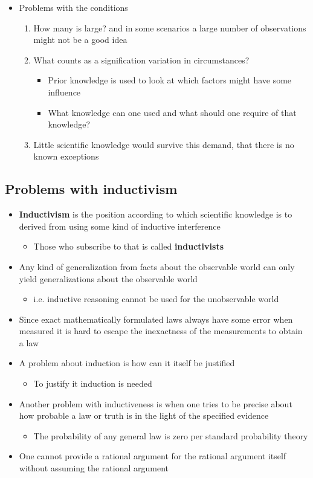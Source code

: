 \documentclass[11pt]{article}
\begin{document}
\begin{itemize}
\item Problems with the conditions
\begin{enumerate}
\item How many is large? and in some scenarios a large number of observations might not be a good idea
\item What counts as a signification variation in circumstances?
\begin{itemize}
\item Prior knowledge is used to look at which factors might have some influence
\item What knowledge can one used and what should one require of that knowledge?
\end{itemize}
\item Little scientific knowledge would survive this demand, that there is no known exceptions
\end{enumerate}
\end{itemize}

\subsection{Problems with inductivism}
\label{sec:org6b7e734}
\begin{itemize}
\item \textbf{Inductivism} is the position according to which scientific knowledge is to derived from using some kind of inductive interference
\begin{itemize}
\item Those who subscribe to that is called \textbf{inductivists}
\end{itemize}
\item Any kind of generalization from facts about the observable world can only yield generalizations about the observable world
\begin{itemize}
\item i.e. inductive reasoning cannot be used for the unobservable world
\end{itemize}
\item Since exact mathematically formulated laws always have some error when measured it is hard to escape the inexactness of the measurements to obtain a law
\item A problem about induction is how can it itself be justified
\begin{itemize}
\item To justify it induction is needed
\end{itemize}
\item Another problem with inductiveness is when one tries to be precise about how probable a law or truth is in the light of the specified evidence 
\begin{itemize}
\item The probability of any general law is zero per standard probability theory
\end{itemize}
\item One cannot provide a rational argument for the rational argument itself without assuming the rational argument
\end{itemize}
\end{document}

